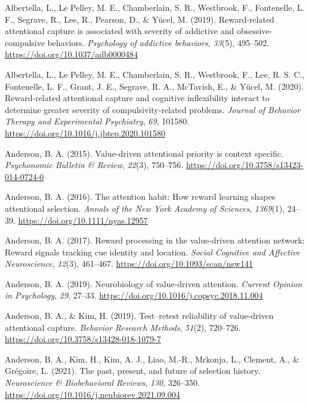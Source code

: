 \documentclass[
  man,
  floatsintext,
  longtable,
  nolmodern,
  notxfonts,
  notimes,
  mask,
  colorlinks=true,linkcolor=blue,citecolor=blue,urlcolor=blue]{apa7}
\newlength{\cslhangindent}
\newenvironment{CSLReferences}[2] %
 {\begin{list}{}{%
  \setlength{\itemindent}{0pt}
  \setlength{\leftmargin}{0pt}
  \setlength{\parsep}{0pt}
  \ifodd #1
   \setlength{\leftmargin}{\cslhangindent}
   \setlength{\itemindent}{-1\cslhangindent}
  \fi
  \setlength{\itemsep}{#2\baselineskip}}}
 {\end{list}}
\begin{document}
\label{refs}
\begin{CSLReferences}{1}{0}
Albertella, L., Le Pelley, M. E., Chamberlain, S. R., Westbrook, F.,
Fontenelle, L. F., Segrave, R., Lee, R., Pearson, D., \& Yücel, M.
(2019). Reward-related attentional capture is associated with severity
of addictive and obsessive-compulsive behaviors. \emph{Psychology of
addictive behaviors}, \emph{33}(5), 495--502.
\url{https://doi.org/10.1037/adb0000484}

Albertella, L., Le Pelley, M. E., Chamberlain, S. R., Westbrook, F.,
Lee, R. S. C., Fontenelle, L. F., Grant, J. E., Segrave, R. A.,
McTavish, E., \& Yücel, M. (2020). Reward-related attentional capture
and cognitive inflexibility interact to determine greater severity of
compulsivity-related problems. \emph{Journal of Behavior Therapy and
Experimental Psychiatry}, \emph{69}, 101580.
\url{https://doi.org/10.1016/j.jbtep.2020.101580}

Anderson, B. A. (2015). Value-driven attentional priority is context
specific. \emph{Psychonomic Bulletin \& Review}, \emph{22}(3), 750--756.
\url{https://doi.org/10.3758/s13423-014-0724-0}

Anderson, B. A. (2016). The attention habit: How reward learning shapes
attentional selection. \emph{Annals of the New York Academy of
Sciences}, \emph{1369}(1), 24--39.
\url{https://doi.org/10.1111/nyas.12957}

Anderson, B. A. (2017). Reward processing in the value-driven attention
network: Reward signals tracking cue identity and location. \emph{Social
Cognitive and Affective Neuroscience}, \emph{12}(3), 461--467.
\url{https://doi.org/10.1093/scan/nsw141}

Anderson, B. A. (2019). Neurobiology of value-driven attention.
\emph{Current Opinion in Psychology}, \emph{29}, 27--33.
\url{https://doi.org/10.1016/j.copsyc.2018.11.004}

Anderson, B. A., \& Kim, H. (2019). Test--retest reliability of
value-driven attentional capture. \emph{Behavior Research Methods},
\emph{51}(2), 720--726. \url{https://doi.org/10.3758/s13428-018-1079-7}

Anderson, B. A., Kim, H., Kim, A. J., Liao, M.-R., Mrkonja, L., Clement,
A., \& Grégoire, L. (2021). The past, present, and future of selection
history. \emph{Neuroscience \& Biobehavioral Reviews}, \emph{130},
326--350. \url{https://doi.org/10.1016/j.neubiorev.2021.09.004}


\end{CSLReferences}
\end{document}
